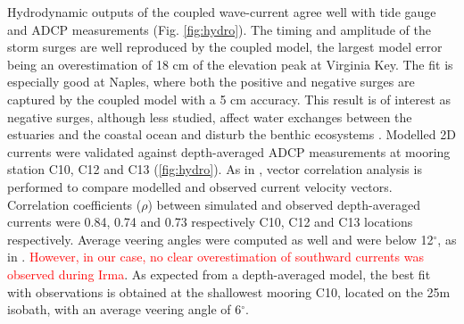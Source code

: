 \documentclass[11pt,a4paper]{article}
\begin{document}
Hydrodynamic outputs of the coupled wave-current agree well with tide gauge and ADCP measurements (Fig. \ref{fig:hydro}). The timing and amplitude of the storm surges are well reproduced by the coupled model, the largest model error being an overestimation of 18 cm of the elevation peak at Virginia Key. The fit is especially good at Naples, where both the positive and negative surges are captured by the coupled model with a 5 cm accuracy. This result is of interest as negative surges, although less studied, affect water exchanges between the estuaries and the coastal ocean and disturb the benthic ecosystems \citep{liu2020impacts}. Modelled 2D currents were validated against depth-averaged ADCP measurements at mooring station C10, C12 and C13 (\ref{fig:hydro}). As in \citep{liu2020impacts}, vector correlation analysis \citep{kundu1976ekman} is performed to compare modelled and observed current velocity vectors. Correlation coefficients ($\rho$) between simulated and observed depth-averaged currents were 0.84, 0.74 and 0.73 respectively C10, C12 and C13 locations respectively. Average veering angles were computed as well and were below 12$^\circ$, as in \citep{liu2020impacts}.\textcolor{red}{ However, in our case, no clear overestimation of southward currents was observed during Irma}. As expected from a depth-averaged model, the best fit with observations is obtained at the shallowest mooring C10, located on the 25m isobath, with an average veering angle of 6$^\circ$. 
\end{document}
